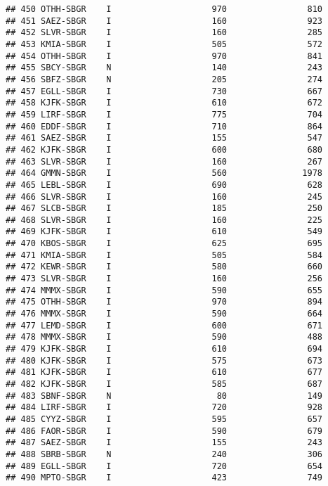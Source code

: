 \documentclass[
]{article}
\begin{document}
\begin{verbatim}
## 450 OTHH-SBGR    I                    970                810
## 451 SAEZ-SBGR    I                    160                923
## 452 SLVR-SBGR    I                    160                285
## 453 KMIA-SBGR    I                    505                572
## 454 OTHH-SBGR    I                    970                841
## 455 SBCY-SBGR    N                    140                243
## 456 SBFZ-SBGR    N                    205                274
## 457 EGLL-SBGR    I                    730                667
## 458 KJFK-SBGR    I                    610                672
## 459 LIRF-SBGR    I                    775                704
## 460 EDDF-SBGR    I                    710                864
## 461 SAEZ-SBGR    I                    155                547
## 462 KJFK-SBGR    I                    600                680
## 463 SLVR-SBGR    I                    160                267
## 464 GMMN-SBGR    I                    560               1978
## 465 LEBL-SBGR    I                    690                628
## 466 SLVR-SBGR    I                    160                245
## 467 SLCB-SBGR    I                    185                250
## 468 SLVR-SBGR    I                    160                225
## 469 KJFK-SBGR    I                    610                549
## 470 KBOS-SBGR    I                    625                695
## 471 KMIA-SBGR    I                    505                584
## 472 KEWR-SBGR    I                    580                660
## 473 SLVR-SBGR    I                    160                256
## 474 MMMX-SBGR    I                    590                655
## 475 OTHH-SBGR    I                    970                894
## 476 MMMX-SBGR    I                    590                664
## 477 LEMD-SBGR    I                    600                671
## 478 MMMX-SBGR    I                    590                488
## 479 KJFK-SBGR    I                    610                694
## 480 KJFK-SBGR    I                    575                673
## 481 KJFK-SBGR    I                    610                677
## 482 KJFK-SBGR    I                    585                687
## 483 SBNF-SBGR    N                     80                149
## 484 LIRF-SBGR    I                    720                928
## 485 CYYZ-SBGR    I                    595                657
## 486 FAOR-SBGR    I                    590                679
## 487 SAEZ-SBGR    I                    155                243
## 488 SBRB-SBGR    N                    240                306
## 489 EGLL-SBGR    I                    720                654
## 490 MPTO-SBGR    I                    423                749

\end{verbatim}
\end{document}
